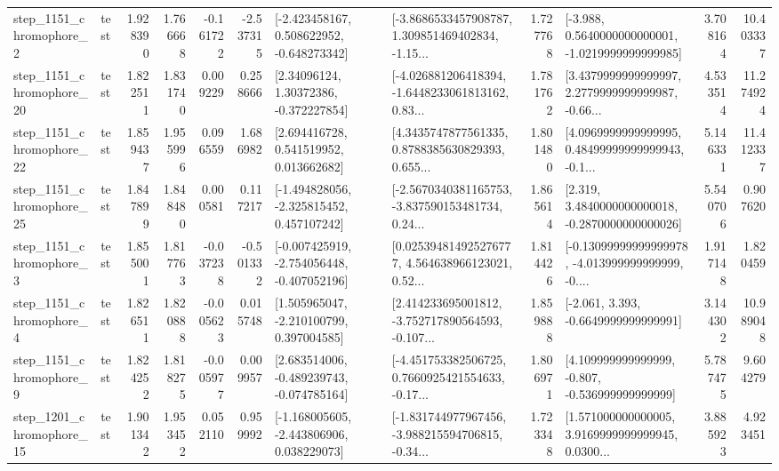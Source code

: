 \begin{tabular}{llrrrrllrlrr}
  step\_1151\_chromophore\_2 &      test &      1.928390 &    1.766668 &     -0.161722 & -2.537315 &   [-2.423458167, 0.508622952, -0.648273342] &  [-3.8686533457908787, 1.309851469402834, -1.15... &       1.727768 &  [-3.988, 0.5640000000000001, -1.0219999999999985] &            3.708164 &         10.403337 \\
 step\_1151\_chromophore\_20 &      test &      1.822511 &    1.831740 &      0.009229 &  0.258666 &      [2.34096124, 1.30372386, -0.372227854] &  [-4.026881206418394, -1.6448233061813162, 0.83... &       1.781762 &  [3.4379999999999997, 2.2779999999999987, -0.66... &            4.533514 &         11.274924 \\
 step\_1151\_chromophore\_22 &      test &      1.859437 &    1.955996 &      0.096559 &  1.686982 &     [2.694416728, 0.541519952, 0.013662682] &  [4.3435747877561335, 0.8788385630829393, 0.655... &       1.801480 &  [4.0969999999999995, 0.48499999999999943, -0.1... &            5.146331 &         11.412337 \\
 step\_1151\_chromophore\_25 &      test &      1.847899 &    1.848480 &      0.000581 &  0.117217 &   [-1.494828056, -2.325815452, 0.457107242] &  [-2.5670340381165753, -3.837590153481734, 0.24... &       1.865614 &   [2.319, 3.4840000000000018, -0.2870000000000026] &            5.540706 &          0.907620 \\
  step\_1151\_chromophore\_3 &      test &      1.855001 &    1.817763 &     -0.037238 & -0.501332 &  [-0.007425919, -2.754056448, -0.407052196] &  [0.025394814925276777, 4.564638966123021, 0.52... &       1.814426 &  [-0.13099999999999978, -4.013999999999999, -0.... &            1.917148 &          1.820459 \\
  step\_1151\_chromophore\_4 &      test &      1.826511 &    1.820888 &     -0.005623 &  0.015748 &    [1.505965047, -2.210100799, 0.397004585] &  [2.414233695001812, -3.752717890564593, -0.107... &       1.859888 &               [-2.061, 3.393, -0.6649999999999991] &            3.144302 &         10.989048 \\
  step\_1151\_chromophore\_9 &      test &      1.824252 &    1.818275 &     -0.005977 &  0.009957 &   [2.683514006, -0.489239743, -0.074785164] &  [-4.451753382506725, 0.7660925421554633, -0.17... &       1.806971 &    [4.109999999999999, -0.807, -0.536999999999999] &            5.787475 &          9.604279 \\
 step\_1201\_chromophore\_15 &      test &      1.901342 &    1.953452 &      0.052110 &  0.959992 &   [-1.168005605, -2.443806906, 0.038229073] &  [-1.831744977967456, -3.988215594706815, -0.34... &       1.723348 &  [1.571000000000005, 3.9169999999999945, 0.0300... &            3.885923 &          4.923451 \\

\end{tabular}
